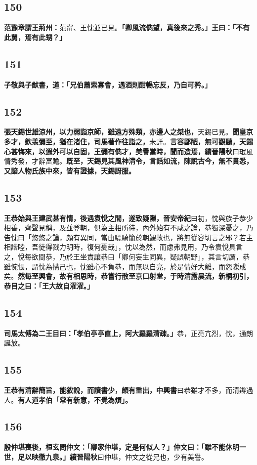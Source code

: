 \subsection*{150}

\textbf{范豫章謂王荊州：}{\footnotesize 范甯、王忱並已見。}\textbf{「卿風流儁望，真後來之秀。」王曰：「不有此舅，焉有此甥？」}

\subsection*{151}

\textbf{子敬與子猷書，道：「兄伯蕭索寡會，遇酒則酣暢忘反，乃自可矜。」}

\subsection*{152}

\textbf{張天錫世雄涼州，以力弱詣京師，雖遠方殊類，亦邊人之桀也，}{\footnotesize 天錫已見。}\textbf{聞皇京多才，欽羡彌至，猶在渚住，司馬著作往詣之，}{\footnotesize 未詳。}\textbf{言容鄙陋，無可觀聽，天錫心甚悔來，以遐外可以自固，王彌有儁才，美譽當時，聞而造焉，}{\footnotesize \textbf{續晉陽秋}曰珉風情秀發，才辭富贍。}\textbf{既至，天錫見其風神清令，言話如流，陳說古今，無不貫悉，又諳人物氏族中來，皆有證據，天錫訝服。}

\subsection*{153}

\textbf{王恭始與王建武甚有情，後遇袁悅之間，遂致疑隟，}{\footnotesize \textbf{晉安帝紀}曰初，忱與族子恭少相善，齊聲見稱，及並登朝，俱為主相所待，內外始有不咸之論，恭獨深憂之，乃告忱曰「悠悠之論，頗有異同，當由驃騎簡於朝覲故也，將無從容切言之邪？若主相諧睦，吾徒得戮力明時，復何憂哉」，忱以為然，而慮弗見用，乃令袁悅具言之，悅每欲間恭，乃於王坐責讓恭曰「卿何妄生同異，疑誤朝野」，其言切厲，恭雖惋悵，謂忱為搆己也，忱雖心不負恭，而無以自亮，於是情好大離，而怨隟成矣。}\textbf{然每至興會，故有相思時，恭嘗行散至京口射堂，于時清露晨流，新桐初引，恭目之曰：「王大故自濯濯。」}

\subsection*{154}

\textbf{司馬太傅為二王目曰：「孝伯亭亭直上，阿大羅羅清疎。」}{\footnotesize 恭，正亮亢烈，忱，通朗誕放。}

\subsection*{155}

\textbf{王恭有清辭簡旨，能敘說，而讀書少，頗有重出，}{\footnotesize \textbf{中興書}曰恭雖才不多，而清辯過人。}\textbf{有人道孝伯「常有新意，不覺為煩」。}

\subsection*{156}

\textbf{殷仲堪喪後，桓玄問仲文：「卿家仲堪，定是何似人？」仲文曰：「雖不能休明一世，足以映徹九泉。」}{\footnotesize \textbf{續晉陽秋}曰仲堪，仲文之從兄也，少有美譽。}